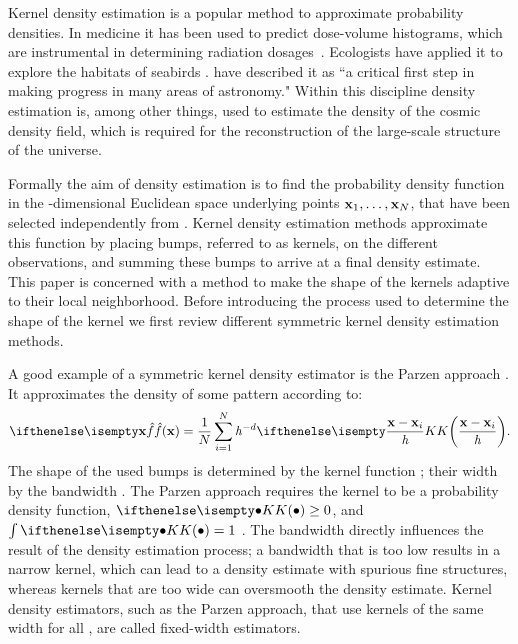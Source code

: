 Kernel density estimation is a popular method to approximate probability densities. In medicine it has been used to predict dose-volume histograms, which are instrumental in determining radiation \mbox{dosages \cite{SkarpmanDose2015}}. Ecologists have applied it to explore the habitats of seabirds \cite{lees2016using}. \textcite{ferdosi2011comparison} have described it as ``a critical first step in making progress in many areas of astronomy."  Within this discipline  density estimation is, among other things, used to estimate the density of the cosmic density field, which is required for the reconstruction of the large-scale structure of the universe.

Formally the aim of density estimation is to find the probability density function \varDensityFunction{\varPattern} in the \varDim-dimensional Euclidean space underlying \varNumPatterns points $\varPattern[1], \dotsc, \varPattern[\varNumPatterns]$, that have been selected independently from \varDensityFunction{\varPattern}. Kernel density estimation methods approximate this function by placing bumps, referred to as kernels, on the different observations, and summing these bumps to arrive at a final density estimate. This paper is concerned with a method to make the shape of the kernels adaptive to their local neighborhood. Before introducing the process used to determine the shape of the kernel we first review different symmetric kernel density estimation methods.

	A good example of a symmetric kernel density estimator is the Parzen approach \cite{parzen1962estimation}. It approximates the density of some pattern \varPattern according to:
	\begin{equation}\label{eq:1:parzen}
		\varEstimatedDensityFunction{\varPattern} = \frac{1}{\varNumPatterns}\sum_{\itXis = 1}^{\varNumPatterns} \varBandwidth^{-\varDim}\varKernel{\frac{\varPattern - \varPattern[\itXis]}{\varBandwidth}}.
	\end{equation}
	The shape of the used bumps is determined by the kernel function \varKernel{\bullet}; their width by the bandwidth \varBandwidth. The Parzen approach requires the kernel to be a probability density function, \ie $\varKernel{\bullet} \geq 0$, and $\int \varKernel{\bullet} = 1$ \cite{silverman1986density}.
	The bandwidth directly influences the result of the density estimation process; a bandwidth that is too low results in a narrow kernel, which can lead to a density estimate with spurious fine structures, whereas kernels that are too wide can oversmooth the density estimate. Kernel density estimators, such as the Parzen approach, that use kernels of the same width for all \varPattern[\itXis], are called fixed-width estimators.

